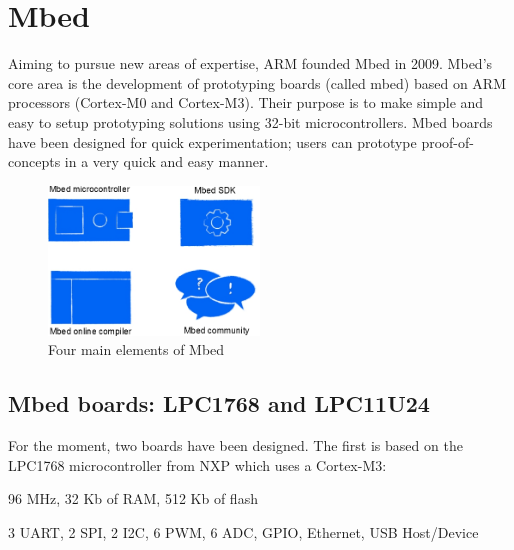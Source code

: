 \documentclass[pdftex,10pt,a4paper]{report}
\newenvironment{packed_item}{
\begin{itemize}
  \setlength{\itemsep}{1pt}
  \setlength{\parskip}{0pt}
  \setlength{\parsep}{0pt}
}{\end{itemize}}
\begin{document}
\newpage

\section{Mbed}
Aiming to pursue new areas of expertise, ARM founded Mbed in 2009. Mbed's core area is the development of prototyping boards (called mbed) based on ARM processors (Cortex-M0 and Cortex-M3). Their purpose is to make simple and easy to setup prototyping solutions using 32-bit microcontrollers. Mbed boards have been designed for quick experimentation; users can prototype proof-of-concepts in a very quick and easy manner.
	
\begin{figure}[h!]
\centering
\includegraphics[width=0.5\textwidth]{./mbed_4elements.jpg}
\caption{Four main elements of Mbed}
\label{Four main elements of Mbed}
\end{figure}

\subsection{Mbed boards: LPC1768 and LPC11U24}
For the moment, two boards have been designed. The first is based on the LPC1768 microcontroller from NXP which uses a Cortex-M3:
\begin{packed_item}
	\item 96 MHz, 32 Kb of RAM, 512 Kb of flash
	\item 3 UART, 2 SPI, 2 I2C, 6 PWM, 6 ADC, GPIO, Ethernet, USB Host/Device
\end{packed_item}
\end{document}
